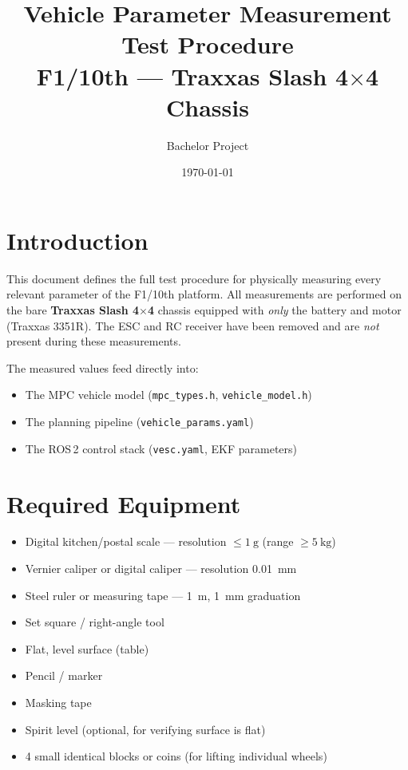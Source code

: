 \documentclass[a4paper,11pt]{article}
\title{%
  Vehicle Parameter Measurement Test Procedure\\[4pt]
  \large F1/10th — Traxxas Slash 4$\times$4 Chassis%
}
\author{Bachelor Project}
\date{\today}
\begin{document}
\maketitle
\tableofcontents
\newpage

\section{Introduction}

This document defines the full test procedure for physically measuring every
relevant parameter of the F1/10th platform.  All measurements are performed
on the bare \textbf{Traxxas Slash 4$\times$4} chassis equipped with
\emph{only} the battery and motor (Traxxas 3351R).  The ESC and RC receiver
have been removed and are \emph{not} present during these measurements.

The measured values feed directly into:
\begin{itemize}
  \item The MPC vehicle model (\texttt{mpc\_types.h}, \texttt{vehicle\_model.h})
  \item The planning pipeline (\texttt{vehicle\_params.yaml})
  \item The ROS\,2 control stack (\texttt{vesc.yaml}, EKF parameters)
\end{itemize}

\section{Required Equipment}

\begin{itemize}
  \item Digital kitchen/postal scale — resolution $\leq\SI{1}{\gram}$
        (range $\geq\SI{5}{\kilo\gram}$)
  \item Vernier caliper or digital caliper — resolution \SI{0.01}{\milli\metre}
  \item Steel ruler or measuring tape — \SI{1}{\metre}, \SI{1}{\milli\metre} graduation
  \item Set square / right-angle tool
  \item Flat, level surface (table)
  \item Pencil / marker
  \item Masking tape
  \item Spirit level (optional, for verifying surface is flat)
  \item 4 small identical blocks or coins (for lifting individual wheels)
\end{itemize}
\end{document}
